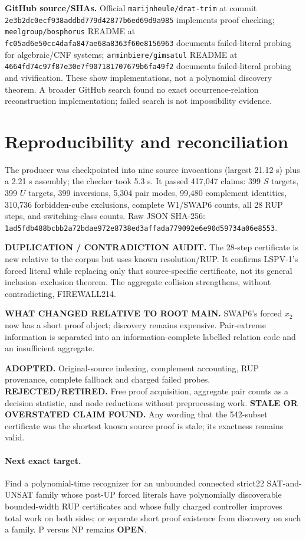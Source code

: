 \documentclass[10pt]{article}
\newcommand{\OPEN}{\textbf{OPEN}}
\begin{document}
\textbf{GitHub source/SHAs.} Official \texttt{marijnheule/drat-trim} at commit \texttt{2e3b2dc0ecf938addbd779d42877b6ed69d9a985} implements proof checking; \texttt{meelgroup/bosphorus} README at \texttt{fc05ad6e50cc4dafa847ae68a8363f60e8156963} documents failed-literal probing for algebraic/CNF systems; \texttt{arminbiere/gimsatul} README at \texttt{4664fd74c97f87e30e7f907181707679b6fa49f2} documents failed-literal probing and vivification. These show implementations, not a polynomial discovery theorem. A broader GitHub search found no exact occurrence-relation reconstruction implementation; failed search is not impossibility evidence.

\section{Reproducibility and reconciliation}
The producer was checkpointed into nine source invocations (largest 21.12 s) plus a 2.21 s assembly; the checker took 5.3 s. It passed 417,047 claims: 399 $S$ targets, 399 $U$ targets, 399 inversions, 5,304 pair modes, 99,480 complement identities, 310,736 forbidden-cube exclusions, complete W1/SWAP6 counts, all 28 RUP steps, and switching-class counts. Raw JSON SHA-256: \texttt{1ad5fdb488bcbb2a72bdae972e8738ed3affada779092e6e90d59734a06e8553}.

\textbf{DUPLICATION / CONTRADICTION AUDIT.} The 28-step certificate is new relative to the corpus but uses known resolution/RUP. It confirms LSPV-1's forced literal while replacing only that source-specific certificate, not its general inclusion--exclusion theorem. The aggregate collision strengthens, without contradicting, FIREWALL214.

\textbf{WHAT CHANGED RELATIVE TO ROOT MAIN.} SWAP6's forced $x_2$ now has a short proof object; discovery remains expensive. Pair-extreme information is separated into an information-complete labelled relation code and an insufficient aggregate.

\textbf{ADOPTED.} Original-source indexing, complement accounting, RUP provenance, complete fallback and charged failed probes. \textbf{REJECTED/RETIRED.} Free proof acquisition, aggregate pair counts as a decision statistic, and node reductions without preprocessing work. \textbf{STALE OR OVERSTATED CLAIM FOUND.} Any wording that the 542-subset certificate was the shortest known source proof is stale; its exactness remains valid.

\paragraph{Next exact target.} Find a polynomial-time recognizer for an unbounded connected strict22 SAT-and-UNSAT family whose post-UP forced literals have polynomially discoverable bounded-width RUP certificates and whose fully charged controller improves total work on both sides; or separate short proof existence from discovery on such a family. P versus NP remains \OPEN.
\end{document}
